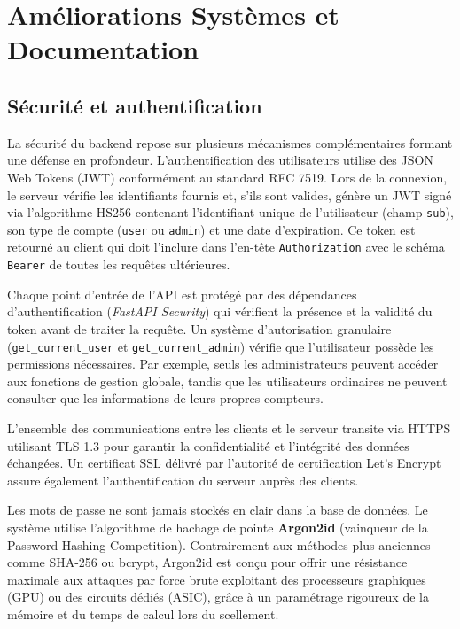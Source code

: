 \documentclass[11pt,a4paper]{article}
\begin{document}
\section{Améliorations Systèmes et Documentation}

\subsection{Sécurité et authentification}

La sécurité du backend repose sur plusieurs mécanismes complémentaires formant une défense en profondeur. L'authentification des utilisateurs utilise des JSON Web Tokens (JWT) conformément au standard RFC 7519. Lors de la connexion, le serveur vérifie les identifiants fournis et, s'ils sont valides, génère un JWT signé via l'algorithme HS256 contenant l'identifiant unique de l'utilisateur (champ \texttt{sub}), son type de compte (\texttt{user} ou \texttt{admin}) et une date d'expiration. Ce token est retourné au client qui doit l'inclure dans l'en-tête \texttt{Authorization} avec le schéma \texttt{Bearer} de toutes les requêtes ultérieures.

Chaque point d'entrée de l'API est protégé par des dépendances d'authentification (\textit{FastAPI Security}) qui vérifient la présence et la validité du token avant de traiter la requête. Un système d'autorisation granulaire (\texttt{get\_current\_user} et \texttt{get\_current\_admin}) vérifie que l'utilisateur possède les permissions nécessaires. Par exemple, seuls les administrateurs peuvent accéder aux fonctions de gestion globale, tandis que les utilisateurs ordinaires ne peuvent consulter que les informations de leurs propres compteurs.

L'ensemble des communications entre les clients et le serveur transite via HTTPS utilisant TLS 1.3 pour garantir la confidentialité et l'intégrité des données échangées. Un certificat SSL délivré par l'autorité de certification Let's Encrypt assure également l'authentification du serveur auprès des clients.

Les mots de passe ne sont jamais stockés en clair dans la base de données. Le système utilise l'algorithme de hachage de pointe \textbf{Argon2id} (vainqueur de la Password Hashing Competition). Contrairement aux méthodes plus anciennes comme SHA-256 ou bcrypt, Argon2id est conçu pour offrir une résistance maximale aux attaques par force brute exploitant des processeurs graphiques (GPU) ou des circuits dédiés (ASIC), grâce à un paramétrage rigoureux de la mémoire et du temps de calcul lors du scellement.
\end{document}
